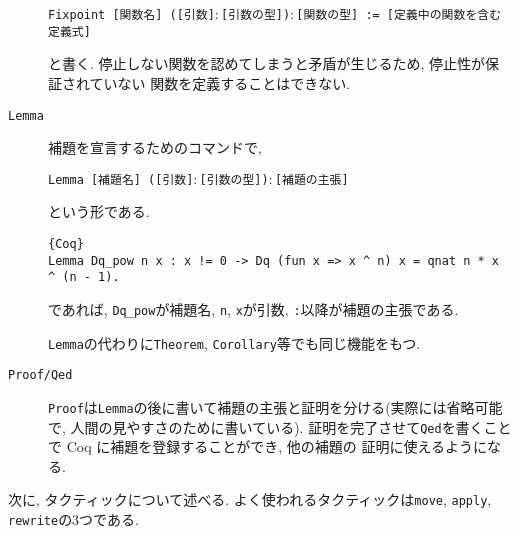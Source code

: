 \documentclass[11pt]{jsreport}
\theoremstyle{mystyle}
\newcommand{\0}{\textbf{0}}
\newcommand{\1}{\textbf{1}}
\newcommand{\2}{\textbf{2}}
\begin{document}
\begin{description}
    {\tt Fixpoint [関数名] ([引数]$\colon$[引数の型])$\colon$[関数の型] := 
    [定義中の関数を含む定義式]}
    
    と書く. 停止しない関数を認めてしまうと矛盾が生じるため, 停止性が保証されていない
    関数を定義することはできない. 
  \item[\tt Lemma]
    補題を宣言するためのコマンドで,
    
    {\tt Lemma [補題名] ([引数]$\colon$[引数の型])$\colon$[補題の主張]}
    
    という形である. 
    \begin{lstlisting}{Coq}
Lemma Dq_pow n x : x != 0 -> Dq (fun x => x ^ n) x = qnat n * x ^ (n - 1). \end{lstlisting}
    であれば, {\tt Dq\_pow}が補題名, {\tt n}, {\tt x}が引数, {\tt :}以降が補題の主張である. 
    
    {\tt Lemma}の代わりに{\tt Theorem}, {\tt Corollary}等でも同じ機能をもつ. 
  \item[\tt Proof/Qed]
    {\tt Proof}は{\tt Lemma}の後に書いて補題の主張と証明を分ける(実際には省略可能で, 
    人間の見やすさのために書いている). 
    証明を完了させて{\tt Qed}を書くことで Coq に補題を登録することができ, 他の補題の
    証明に使えるようになる. 
\end{description}
次に, タクティックについて述べる. よく使われるタクティックは{\tt move}, {\tt apply}, {\tt rewrite}の3つである. 
\end{document}

